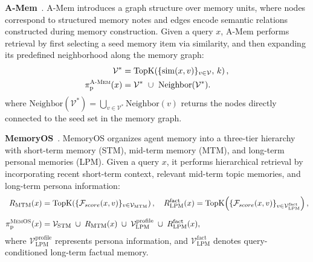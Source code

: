 \documentclass{llmxive}
\begin{document}
\textbf{A-Mem}~\cite{DBLP:journals/corr/abs-2502-12110}.
A-Mem introduces a graph structure over memory units, where nodes correspond to structured memory notes and edges encode semantic relations constructed during memory construction. 
Given a query $x$, A-Mem performs retrieval by first selecting a seed memory item via similarity, and then expanding its predefined neighborhood along the memory graph: %
\begin{equation}
\begin{aligned}
\mathcal{V}^* &= \mathrm{TopK}\!\left(\{\mathrm{sim}(x,v)\}_{v\in\mathcal{V}},\,k\right),\\
\pi_{\mathrm p}^{\textsc{A-Mem}}(x)
&=
\mathcal{V}^* \ \cup\ \mathrm{Neighbor}(\mathcal{V}^*).
\end{aligned}
\end{equation}
where $\mathrm{Neighbor}(\mathcal{V}^*) = \bigcup_{v\in\mathcal{V}^*}\mathrm{Neighbor}(v)$
returns the nodes directly connected to the seed set in the memory graph. 

\textbf{MemoryOS}~\cite{DBLP:journals/corr/abs-2506-06326}.
MemoryOS organizes agent memory into a three-tier hierarchy with short-term memory (STM), mid-term memory (MTM), and long-term personal memories (LPM). Given a query $x$, it performs hierarchical retrieval by incorporating recent short-term context, relevant mid-term topic memories, and long-term persona information:
\begin{equation}
\begin{aligned}
R_{\mathrm{MTM}}(x)
&=
\mathrm{TopK}\!\left(
\{\mathcal{F}_{score}(x,v)\}_{v\in \mathcal{V}_{\mathrm{MTM}}}
\right),
\quad
R_{\mathrm{LPM}}^{\mathrm{fact}}(x)
=
\mathrm{TopK}\!\left(
\{\mathcal{F}_{score}(x,v)\}_{v\in \mathcal{V}_{\mathrm{LPM}}^{\mathrm{fact}}}
\right),\\[6pt]
\pi_{\mathrm p}^{\textsc{MemOS}}(x)
&=
\mathcal{V}_{\mathrm{STM}}
\;\cup\;
R_{\mathrm{MTM}}(x)
\;\cup\;
\mathcal{V}_{\mathrm{LPM}}^{\mathrm{profile}}
\;\cup\;
R_{\mathrm{LPM}}^{\mathrm{fact}}(x),
\end{aligned}
\end{equation}
where $\mathcal{V}_{\mathrm{LPM}}^{\mathrm{profile}}$ represents persona information, and $\mathcal{V}_{\mathrm{LPM}}^{\mathrm{fact}}$ denotes query-conditioned long-term factual memory.
\end{document}
